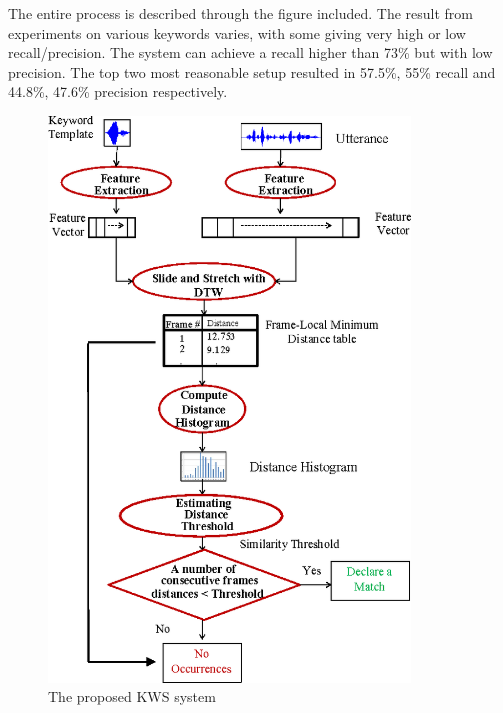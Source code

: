 The entire process is described through the figure included. The result from experiments on various keywords varies, with some giving very high or low recall/precision. The system can achieve a recall higher than 73\% but with low precision. The top two most reasonable setup resulted in 57.5\%, 55\% recall and 44.8\%, 47.6\% precision respectively.
\begin{figure}[h]
    \centering
    \includegraphics[height=15cm]{img/kws_lr2.png}
    \caption{The proposed KWS system}
    \label{fig:lr2}
\end{figure}
